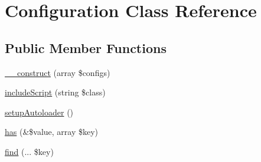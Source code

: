 \hypertarget{class_lora_1_1_configuration}{}\section{Configuration Class Reference}
\label{class_lora_1_1_configuration}
\subsection*{Public Member Functions}
\begin{DoxyCompactItemize}
\item 
\hyperlink{class_lora_1_1_configuration_a4bebb34aeb3da161d6c92f4bbcf09123}{\+\_\+\+\_\+construct} (array \$configs)
\item 
\hyperlink{class_lora_1_1_configuration_a9b14657d7ca60617425e9fb5d81379a3}{include\+Script} (string \$class)
\item 
\hyperlink{class_lora_1_1_configuration_a86348d607b0daaa200f6cdbb59582ef7}{setup\+Autoloader} ()
\item 
\hyperlink{class_lora_1_1_configuration_a4eb96d4eee36a1778069e0c2e2ba24c1}{has} (\&\$value, array \$key)
\item 
\hyperlink{class_lora_1_1_configuration_ab0af62bde4b0a5a69518020bec0b5cbf}{find} (... \$key)
\end{DoxyCompactItemize}
